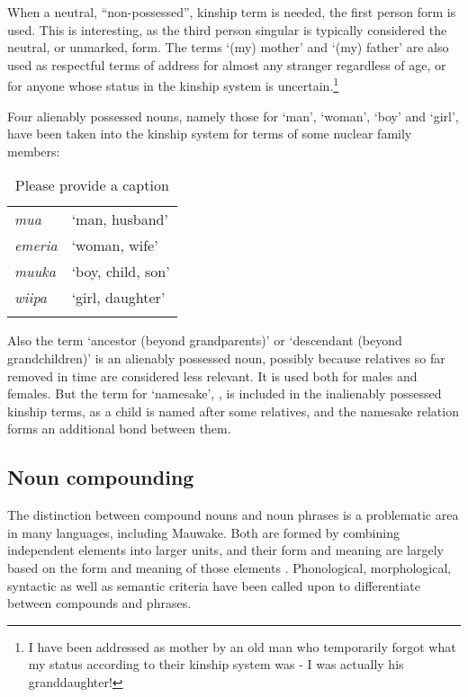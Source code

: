 When a neutral, ``non-possessed'', kinship term is needed, the first person form is used. This is interesting, as the third person singular is typically considered the neutral, or unmarked, form. The terms `(my) mother' and `(my) father' are also used as respectful terms of address for almost any stranger regardless of age, or for anyone whose status in the kinship system is uncertain.\footnote{I have been addressed as {\textquotedbl}mother{\textquotedbl} by an old man who temporarily forgot what my status according to their kinship system was - I was actually his granddaughter!}

Four alienably possessed nouns, namely those for `man', `woman', `boy' and `girl', have been taken into the kinship system for terms of some nuclear family members: 

\begin{table}
\caption{Please provide a caption}
\label{}
\begin{tabular}{>{\itshape}ll}
\mytoprule
mua &`man, husband'\\
emeria &`woman, wife'\\
muuka &`boy, child, son'\\
wiipa &`girl, daughter'\\
\mybottomrule
\end{tabular}
\end{table}


Also the term  `ancestor (beyond grandparents)' or `descendant (beyond grandchildren)' is an alienably possessed noun, possibly because relatives so far removed in time are considered less relevant. It is used both for males and females. But the term for `namesake', , is included in the inalienably possessed kinship terms, as a child is named after some relatives, and the namesake relation forms an additional bond between them.

\subsection{Noun compounding}\label{sec:3.2.5}
{}
The distinction between compound nouns and noun phrases is a problematic area in many languages, including Mauwake. Both are formed by combining independent elements into larger units, and their form and meaning are largely based on the form and meaning of those elements \citep[40]{Anderson1985a}. Phonological, morphological, syntactic as well as semantic criteria have been called upon to differentiate between compounds and phrases.

